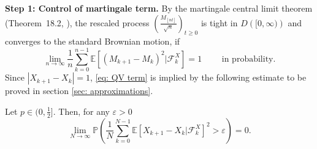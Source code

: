 \documentclass[EJP]{ejpecp} %
\newcommand{\abs}[1]{\left\vert #1 \right\vert}
\begin{document}
\vspace{1em}

\textbf{Step 1: Control of martingale term.}
By the martingale central limit theorem (Theorem~18.2, \cite{B99}), the rescaled process $\left( \frac{M_{\left\lfloor n t \right\rfloor}}{\sqrt{n}} \right) _{t \ge 0}$ is tight in $D\left( [0,\infty ) \right) $ and converges to the standard Brownian motion, if
\begin{equation}\label{eq: QV term}
	\lim_{n\to \infty}\frac{1}{n} \sum_{k=0}^{n-1}\mathbb{E}\left[ (M_{k+1}- M_{k})^2 |\mathcal{F}_k^X \right] =1 \qquad  \mbox{ in probability}.
\end{equation}
Since $\abs{X_{k+1}-X_k}=1$, \eqref{eq: QV term} is implied by the following estimate to be proved in section \ref{sec: approximations}. 
\begin{lemma} \label{lm: control of martingale} 
	Let $p\in (0,\frac{1}{2}]$. Then, for any $\varepsilon >0$
	\begin{equation}\label{eq:  term}
		\lim_{N \to \infty }\mathbb{P}\left(\frac{1}{N} \sum_{k = 0}^{N-1} \mathbb{E}\left[ X_{k+1} - X_k | \mathcal{F}_k^X \right]^2 > \varepsilon \right) =0. 
	\end{equation}
\end{lemma}
\vspace{1em}
\end{document}
